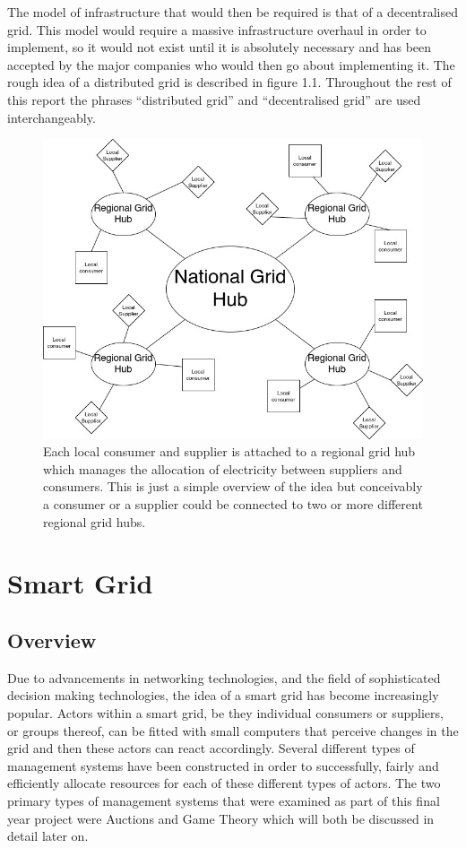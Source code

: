 \documentclass[a4paper, notitlepage]{report}
\begin{document}
The model of infrastructure that would then be required is that of a
decentralised grid. This model would require a massive infrastructure overhaul
in order to implement, so it would not exist until it is absolutely necessary
and has been accepted by the major companies who would then go about
implementing it. The rough idea of a distributed grid is described in figure
1.1. Throughout the rest of this report the phrases “distributed grid” and
“decentralised grid” are used interchangeably.

\begin{figure}[htbp]
\centering
\includegraphics[width=.9\linewidth]{./img/DecentralisedGrid.jpg}
\caption{\label{fig:orgc8486a9}
Each local consumer and supplier is attached to a regional grid hub which manages the allocation of electricity between suppliers and consumers. This is just a simple overview of the idea but conceivably a consumer or a supplier could be connected to two or more different regional grid hubs.}
\end{figure}
\chapter{Smart Grid}
\label{sec:org5c7668e}
\section{Overview}
\label{sec:org8dbbd59}
Due to advancements in networking technologies, and the field of sophisticated
decision making technologies, the idea of a smart grid has become increasingly
popular. Actors within a smart grid, be they individual consumers or suppliers,
or groups thereof, can be fitted with small computers that perceive changes in
the grid and then these actors can react accordingly. Several different types of
management systems have been constructed in order to successfully, fairly and
efficiently allocate resources for each of these different types of actors. The
two primary types of management systems that were examined as part of this final
year project were Auctions and Game Theory which will both be discussed in
detail later on. 
\end{document}
